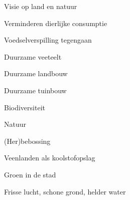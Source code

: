 
\begin{visie-concept}{Visie op land en natuur}\end{visie-concept}

\begin{voorstel-concept}{Verminderen dierlijke consumptie}\end{voorstel-concept}
\begin{voorstel-concept}{Voedselverspilling tegengaan}\end{voorstel-concept}
\begin{voorstel-concept}{Duurzame veeteelt}\end{voorstel-concept}
\begin{voorstel-concept}{Duurzame landbouw}\end{voorstel-concept}
\begin{voorstel-concept}{Duurzame tuinbouw}\end{voorstel-concept}
\begin{voorstel-concept}{Biodiversiteit}\end{voorstel-concept}
\begin{voorstel-concept}{Natuur}\end{voorstel-concept}
\begin{voorstel-concept}{(Her)bebossing}\end{voorstel-concept}
\begin{voorstel-concept}{Veenlanden als koolstofopslag}\end{voorstel-concept}
\begin{voorstel-concept}{Groen in de stad}\end{voorstel-concept}
\begin{voorstel-concept}{Frisse lucht, schone grond, helder water}\end{voorstel-concept}